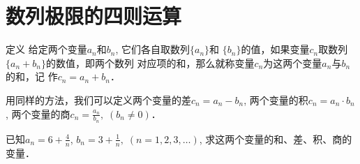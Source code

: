 \section{数列极限的四则运算}
\begin{blk}{定义}
 给定两个变量$a_n$和$b_n$, 它们各自取数列$\{a_n\}$和
$\{b_n\}$的值，如果变量$c_n$取数列$\{a_n+b_n\}$的数值，即两个数列
对应项的和，那么就称变量$c_n$为这两个变量$a_n$与$b_n$的和，记
作$c_n=a_n+b_n$．   
\end{blk}
 
用同样的方法，我们可以定义两个变量的差$c_n=a_n-b_n$,
 两个变量的积$c_n=a_n\cdot b_n$, 两个变量的商$c_n=\frac{a_n}{b_n},\; (b_n\ne 0)$．



\begin{example}
    已知$a_n=6+\frac{4}{n}$, $b_n=3+\frac{1}{n},\; (n=1,2,3,
\ldots)$, 求这两个变量的和、差、积、商的变量．
\end{example}

